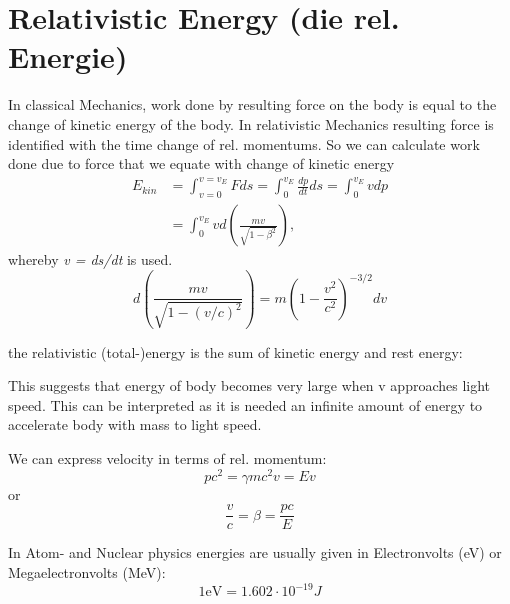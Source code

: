 \documentclass{report}
\begin{document}
\section{Relativistic Energy (die rel. Energie)}
In classical Mechanics, work done by resulting force on the body is equal to the change of kinetic energy of the body. In relativistic Mechanics resulting force is identified with the time change of rel. momentums. So we can calculate work done due to force that we equate with change of kinetic energy
\begin{align*}
    E_{kin} &= \int_{v=0}^{v=v_E} F ds =\int_0^{v_E} \frac{dp}{dt} ds = \int_0^{v_E} v dp \\ &= \int_0^{v_E} v d\left( \frac{mv}{\sqrt{1 - \beta^2}} \right),
\end{align*}
whereby \textit{v = ds/dt} is used.
\begin{equation*}
    d \left( \frac{mv}{\sqrt{1 - (v/c)^2}}\right) = m \left( 1 - \frac{v^2}{c^2} \right)^{-3/2} dv
\end{equation*}


the relativistic (total-)energy is the sum of kinetic energy and rest energy:

This suggests that energy of body becomes very large when v approaches light speed. This can be interpreted as it is needed an infinite amount of energy to accelerate body with mass to light speed.

We can express velocity in terms of rel. momentum:
\begin{equation*}
    pc^2 = \gamma mc^2 v = Ev
\end{equation*}
or 
\begin{equation}
    \frac{v}{c} = \beta = \frac{pc}{E}
\end{equation}

In Atom- and Nuclear physics energies are usually given in Electronvolts (eV) or Megaelectronvolts (MeV):
\begin{equation*}
    1 \textrm{eV} = 1.602 \cdot 10^{-19} J 
\end{equation*}
\end{document}
